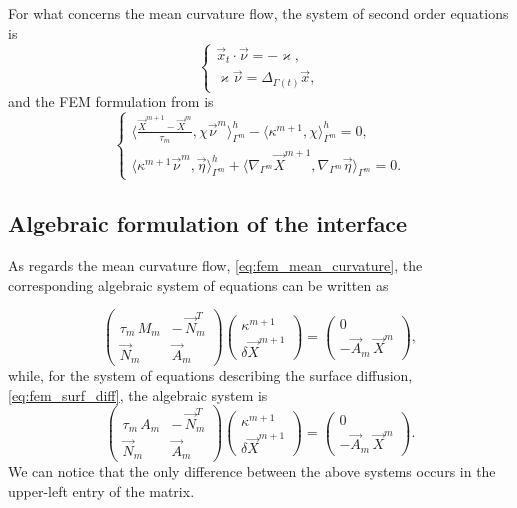 \documentclass[a4paper,11pt, onecolumn]{article}
\begin{document}
\noindent For what concerns the mean curvature flow, the system of second order equations is
\begin{equation}\label{eq:mean_curvature_sys}
 \begin{cases}
  \vec{x}_t\cdot\vec{\nu}=-\varkappa,\\
  \varkappa\vec{\nu}=\Delta_{\Gamma(t)}\vec{x},
 \end{cases}
\end{equation}
and the FEM formulation from \cite{gflows3d} is
\begin{equation}\label{eq:fem_mean_curvature}
 \begin{cases}
  \langle \frac{\vec{X}^{m + 1}-\vec{X}^{m}}{\tau_m},\chi\vec{\nu}^m\rangle_{\Gamma^m}^{h}-\langle\kappa^{m+1},\chi \rangle_{\Gamma^m}^{h}=0,\\
  \langle\kappa^{m+1}\vec{\nu}^m,\vec{\eta}\rangle_{\Gamma^m}^{h}+\langle\nabla_{\Gamma^m}\vec{X}^{m + 1},\nabla_{\Gamma^m}\vec{\eta} \rangle_{\Gamma^m}=0.
 \end{cases}
\end{equation}

\subsection{Algebraic formulation of the interface}

As regards the mean curvature flow, \eqref{eq:fem_mean_curvature}, the corresponding algebraic system of equations can be written as

\begin{equation}\label{eq:algebraic_mean_curvature}
 \begin{pmatrix}
  \tau_m \, M_m & - \, \vec{N}_{m}^{T} \\ \vec{N}_m & \vec{A}_m
 \end{pmatrix}
 \begin{pmatrix}
  \kappa^{m + 1} \\ \delta \vec{X}^{m + 1}
 \end{pmatrix}
 = 
 \begin{pmatrix}
  0 \\ - \vec{A}_m \, \vec{X}^{m}
 \end{pmatrix} , 
\end{equation}
while, for the system of equations describing the surface diffusion, \eqref{eq:fem_surf_diff}, the algebraic system is 
\begin{equation}\label{eq:algebraic_surf_diff}
 \begin{pmatrix}
  \tau_m \, A_m & - \, \vec{N}_{m}^{T} \\ \vec{N}_m & \vec{A}_m
 \end{pmatrix}
 \begin{pmatrix}
  \kappa^{m + 1} \\ \delta \vec{X}^{m + 1}
 \end{pmatrix}
 = 
 \begin{pmatrix}
  0 \\ - \vec{A}_m \, \vec{X}^{m}
 \end{pmatrix}. 
\end{equation}
We can notice that the only difference between the above systems occurs in the upper-left entry of the matrix.
\newline
\end{document}
